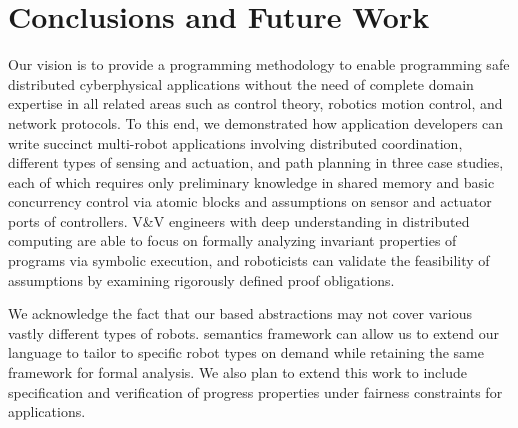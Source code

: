 \section{Conclusions and Future Work}


Our vision is to provide a programming methodology to enable programming safe distributed cyberphysical applications without the need of complete domain expertise in all related areas such as control theory, robotics motion control, and network protocols.
To this end, we demonstrated how \lgname application developers can write succinct multi-robot applications involving distributed coordination,
different types of sensing and actuation, and path planning in three case studies, each of which requires only preliminary knowledge
in shared memory and basic concurrency control via atomic blocks and assumptions on sensor and actuator ports of controllers.
V\&V engineers with deep understanding in distributed computing are able to focus on formally analyzing invariant properties of \lgname programs via symbolic execution, and roboticists can validate the feasibility of assumptions by examining rigorously defined proof obligations.

We acknowledge the fact that our \portasum based abstractions may not cover various vastly different types of robots.
\K semantics framework can allow us to extend our language to tailor to specific robot types on demand
while retaining the same framework for formal analysis. We also plan to extend this work to include specification and verification of progress properties under fairness constraints for \lgname applications.
